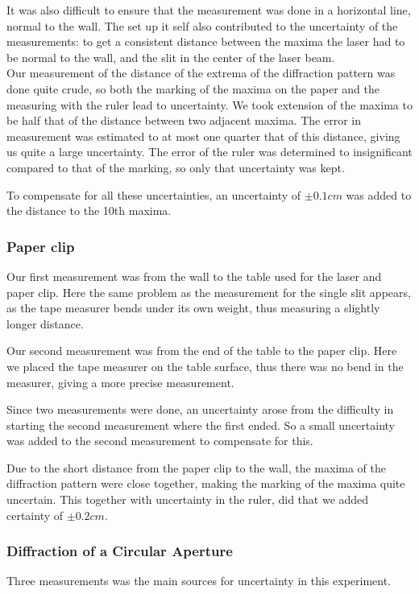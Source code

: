 \documentclass{emulateapj}
\begin{document}
It was also difficult to ensure that the measurement was done in a horizontal line, normal to the wall. The set up it self also contributed to the uncertainty of the measurements: to get a consistent distance between the maxima the laser had to be normal to the wall, and the slit in the center of the laser beam. \\

Our measurement of the distance of the extrema of the diffraction pattern was done quite crude, so both the marking of the maxima on the paper and the measuring with the ruler lead to uncertainty. We took extension of the maxima to be half that of the distance between two adjacent maxima. The error in measurement was estimated to at most one quarter that of this distance, giving us quite a large uncertainty. The error of the ruler was determined to insignificant compared to that of the marking, so only that uncertainty was kept.

To compensate for all these uncertainties, an uncertainty of $\pm 0.1 cm$ was added to the distance to the 10th maxima.


\subsubsection{Paper clip}
Our first measurement was from the wall to the table used for the laser and paper clip. Here the same problem as the measurement for the single slit appears, as the tape measurer bends under its own weight, thus measuring a slightly longer distance. 

Our second measurement was from the end of the table to the paper clip. Here we placed the tape measurer on the table surface, thus there was no bend in the measurer, giving a more precise measurement. 

Since two measurements were done, an uncertainty arose from the difficulty in starting the second measurement where the first ended. So a small uncertainty was added to the second measurement to compensate for this.

Due to the short distance from the paper clip to the wall, the maxima of the diffraction pattern were close together, making the marking of the maxima quite uncertain. This together with uncertainty in the ruler, did that we added certainty of $\pm 0.2 cm$. 

\subsubsection{Diffraction of a Circular Aperture}
Three measurements was the main sources for uncertainty in this experiment.
\end{document}
